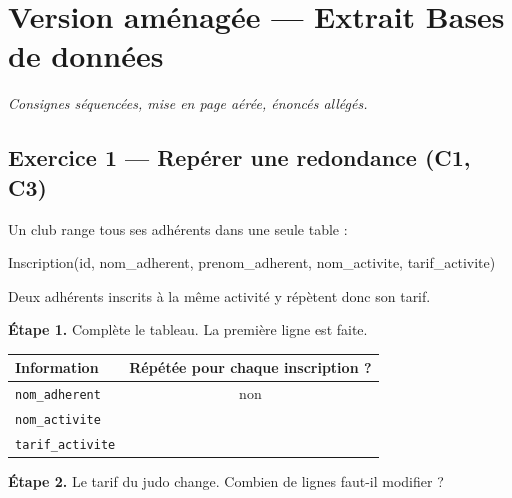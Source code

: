 \section*{Version aménagée --- Extrait Bases de données}
\textit{Consignes séquencées, mise en page aérée, énoncés allégés.}

\bigskip

\subsection*{Exercice 1 --- Repérer une redondance (C1, C3)}

Un club range tous ses adhérents dans une seule table :

\begin{sql}
Inscription(id, nom_adherent, prenom_adherent, nom_activite, tarif_activite)
\end{sql}

\medskip
Deux adhérents inscrits à la même activité y répètent donc son tarif.

\bigskip

\textbf{Étape 1.} Complète le tableau. La première ligne est faite.

\bigskip

\begin{center}
\begin{tabular}{|l|c|}
\hline
\textbf{Information} & \textbf{Répétée pour chaque inscription ?} \\
\hline
\texttt{nom\_adherent} & non \\
\hline
\texttt{nom\_activite} & \dotfill \\
\hline
\texttt{tarif\_activite} & \dotfill \\
\hline
\end{tabular}
\end{center}

\bigskip

\textbf{Étape 2.} Le tarif du judo change. Combien de lignes faut-il modifier ?

\medskip
\begin{center}
 \qquad {}
\end{center}


